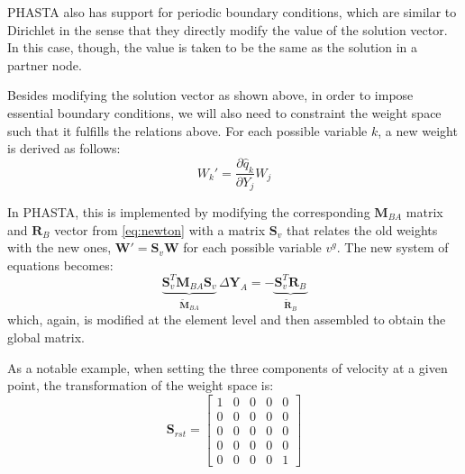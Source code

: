 \documentclass{ucb}
\begin{document}
PHASTA also has support for periodic boundary conditions, which are similar to Dirichlet in the sense that they directly modify the value of the solution vector. In this case, though, the value is taken to be the same as the solution in a partner node.

Besides modifying the solution vector as shown above, in order to impose essential boundary conditions, we will also need to constraint the weight space such that it fulfills the relations above. For each possible variable $k$, a new weight is derived as follows:
\begin{equation}
    W_k' = \frac{\partial \hat{q}_k}{\partial Y_j}W_j
\end{equation}

In PHASTA, this is implemented by modifying the corresponding $\bm{M}_{BA}$ matrix and $\bm{R}_B$ vector from \autoref{eq:newton} with a matrix $\bm{S}_v$ that relates the old weights with the new ones, $\bm{W}' = \bm{S}_v \bm{W}$ for each possible variable $v^g$. The new system of equations becomes:
\begin{equation}
    \underbrace{\bm{S}_v^T\bm{M}_{BA}\bm{S}_v}_{\bm{\tilde{M}}_{BA}} \, \Delta\bm{Y}_A = -\underbrace{\bm{S}_v^T \bm{R}_B}_{\bm{\tilde{R}}_B}
\end{equation}
which, again, is modified at the element level and then assembled to obtain the global matrix.

As a notable example, when setting the three components of velocity at a given point, the transformation of the weight space is:
\begin{equation}
    \bm{S}_{rst} = 
        \begin{bmatrix}
            1 & 0 & 0 & 0 & 0 \\
            0 & 0 & 0 & 0 & 0 \\
            0 & 0 & 0 & 0 & 0 \\
            0 & 0 & 0 & 0 & 0 \\
            0 & 0 & 0 & 0 & 1
        \end{bmatrix}
\end{equation}
\end{document}
